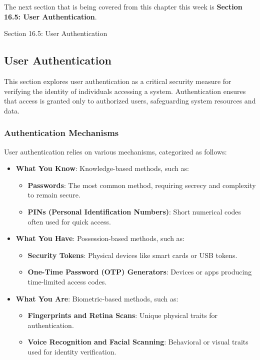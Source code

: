 The next section that is being covered from this chapter this week is \textbf{Section 16.5: User Authentication}.

\begin{notes}{Section 16.5: User Authentication}
    \subsection*{User Authentication}

    This section explores user authentication as a critical security measure for verifying the identity of individuals accessing a system. Authentication ensures that access is granted only to 
    authorized users, safeguarding system resources and data.
    
    \subsubsection*{Authentication Mechanisms}
    
    User authentication relies on various mechanisms, categorized as follows:
    \begin{itemize}
        \item \textbf{What You Know}: Knowledge-based methods, such as:
        \begin{itemize}
            \item \textbf{Passwords}: The most common method, requiring secrecy and complexity to remain secure.
            \item \textbf{PINs (Personal Identification Numbers)}: Short numerical codes often used for quick access.
        \end{itemize}
        \item \textbf{What You Have}: Possession-based methods, such as:
        \begin{itemize}
            \item \textbf{Security Tokens}: Physical devices like smart cards or USB tokens.
            \item \textbf{One-Time Password (OTP) Generators}: Devices or apps producing time-limited access codes.
        \end{itemize}
        \item \textbf{What You Are}: Biometric-based methods, such as:
        \begin{itemize}
            \item \textbf{Fingerprints and Retina Scans}: Unique physical traits for authentication.
            \item \textbf{Voice Recognition and Facial Scanning}: Behavioral or visual traits used for identity verification.
        \end{itemize}
    \end{itemize}
    

\end{notes}
